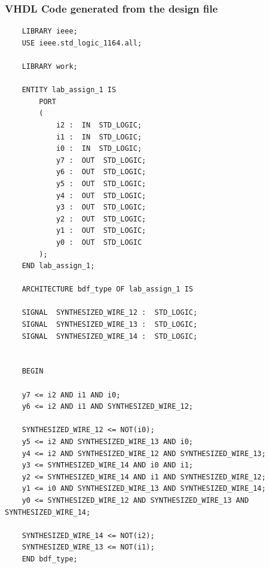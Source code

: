 \documentclass[12pt]{article}
\begin{document}
\subsubsection{VHDL Code generated from the design file}
\begin{verbatim}
    LIBRARY ieee;
    USE ieee.std_logic_1164.all;

    LIBRARY work;

    ENTITY lab_assign_1 IS
    	PORT
    	(
    		i2 :  IN  STD_LOGIC;
    		i1 :  IN  STD_LOGIC;
    		i0 :  IN  STD_LOGIC;
    		y7 :  OUT  STD_LOGIC;
    		y6 :  OUT  STD_LOGIC;
    		y5 :  OUT  STD_LOGIC;
    		y4 :  OUT  STD_LOGIC;
    		y3 :  OUT  STD_LOGIC;
    		y2 :  OUT  STD_LOGIC;
    		y1 :  OUT  STD_LOGIC;
    		y0 :  OUT  STD_LOGIC
    	);
    END lab_assign_1;

    ARCHITECTURE bdf_type OF lab_assign_1 IS

    SIGNAL	SYNTHESIZED_WIRE_12 :  STD_LOGIC;
    SIGNAL	SYNTHESIZED_WIRE_13 :  STD_LOGIC;
    SIGNAL	SYNTHESIZED_WIRE_14 :  STD_LOGIC;


    BEGIN

    y7 <= i2 AND i1 AND i0;
    y6 <= i2 AND i1 AND SYNTHESIZED_WIRE_12;

    SYNTHESIZED_WIRE_12 <= NOT(i0);
    y5 <= i2 AND SYNTHESIZED_WIRE_13 AND i0;
    y4 <= i2 AND SYNTHESIZED_WIRE_12 AND SYNTHESIZED_WIRE_13;
    y3 <= SYNTHESIZED_WIRE_14 AND i0 AND i1;
    y2 <= SYNTHESIZED_WIRE_14 AND i1 AND SYNTHESIZED_WIRE_12;
    y1 <= i0 AND SYNTHESIZED_WIRE_13 AND SYNTHESIZED_WIRE_14;
    y0 <= SYNTHESIZED_WIRE_12 AND SYNTHESIZED_WIRE_13 AND SYNTHESIZED_WIRE_14;

    SYNTHESIZED_WIRE_14 <= NOT(i2);
    SYNTHESIZED_WIRE_13 <= NOT(i1);
    END bdf_type;

\end{verbatim}
\end{document}
